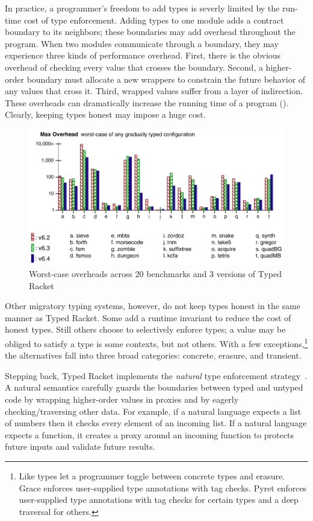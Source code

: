 In practice, a programmer's freedom to add types is severly limited by
 the run-time cost of type enforcement.
Adding types to one module adds a contract boundary to its neighbors;
 these boundaries may add overhead throughout the program.
When two modules communicate through a boundary, they may experience three kinds
 of performance overhead.
First, there is the obvious overhead of checking every value that crosses the
 boundary.
Second, a higher-order boundary must allocate a new wrappers to constrain the
 future behavior of any values that cross it.
Third, wrapped values suffer from a layer of indirection.
These overheads can dramatically increase the running time of a program
 ().
Clearly, keeping types honest may impose a huge cost.

\begin{figure}[h]
  \includegraphics[width=0.8\columnwidth]{src/jfp-2019-max.png}
  \caption{Worst-case overheads across 20 benchmarks and 3 versions of Typed Racket~\cite{gtnffvf-jfp-2019}}
  \label{fig:max-overhead}
\end{figure}

Other migratory typing systems, however, do not keep types honest in the
 same manner as Typed Racket.
Some add a runtime invariant to reduce the cost of honest types.
Still others choose to selectively enforce types; a value may be obliged to
 satisfy a type is some contexts, but not others.
With a few exceptions,\footnote{Like types
 let a programmer toggle between concrete types and erasure.
 Grace enforces user-supplied type annotations with tag checks.
 Pyret enforces user-supplied type annotations with tag checks
  for certain types and a deep traversal for others.}
 the alternatives fall into three broad categories:
 concrete, erasure, and transient.

Stepping back, Typed Racket implements the \emph{natural}\/ type enforcement
 strategy~\cite{mf-toplas-2009,tf-popl-2008}.
A natural semantics carefully guards the boundaries between typed and untyped
 code by wrapping higher-order values in proxies and by eagerly
 checking/traversing other data.
For example, if a natural language expects a list of numbers then it
 checks every element of an incoming list.
If a natural language expects a function, it creates a proxy around an incoming
 function to protects future inputs and validate future results.

